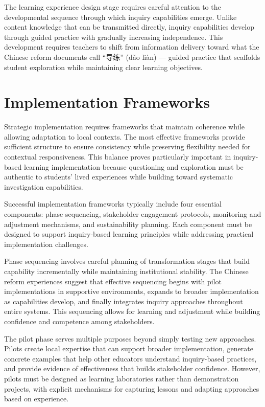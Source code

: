\documentclass[
  Letterpaper,
]{scrbook}
\begin{document}
The learning experience design stage requires careful attention to the
developmental sequence through which inquiry capabilities emerge. Unlike
content knowledge that can be transmitted directly, inquiry capabilities
develop through guided practice with gradually increasing independence.
This development requires teachers to shift from information delivery
toward what the Chinese reform documents call ``导练'' (dǎo liàn) ---
guided practice that scaffolds student exploration while maintaining
clear learning objectives.

\section{Implementation Frameworks}\label{implementation-frameworks}

Strategic implementation requires frameworks that maintain coherence
while allowing adaptation to local contexts. The most effective
frameworks provide sufficient structure to ensure consistency while
preserving flexibility needed for contextual responsiveness. This
balance proves particularly important in inquiry-based learning
implementation because questioning and exploration must be authentic to
students' lived experiences while building toward systematic
investigation capabilities.

Successful implementation frameworks typically include four essential
components: phase sequencing, stakeholder engagement protocols,
monitoring and adjustment mechanisms, and sustainability planning. Each
component must be designed to support inquiry-based learning principles
while addressing practical implementation challenges.

Phase sequencing involves careful planning of transformation stages that
build capability incrementally while maintaining institutional
stability. The Chinese reform experiences suggest that effective
sequencing begins with pilot implementations in supportive environments,
expands to broader implementation as capabilities develop, and finally
integrates inquiry approaches throughout entire systems. This sequencing
allows for learning and adjustment while building confidence and
competence among stakeholders.

The pilot phase serves multiple purposes beyond simply testing new
approaches. Pilots create local expertise that can support broader
implementation, generate concrete examples that help other educators
understand inquiry-based practices, and provide evidence of
effectiveness that builds stakeholder confidence. However, pilots must
be designed as learning laboratories rather than demonstration projects,
with explicit mechanisms for capturing lessons and adapting approaches
based on experience.
\end{document}
